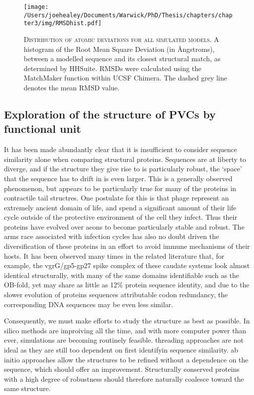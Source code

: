 \begin{figure}[h]
\texttt{[image: /Users/joehealey/Documents/Warwick/PhD/Thesis/chapters/chapter3/img/RMSDhist.pdf]}
	\captionsetup{singlelinecheck=off, justification=justified, font=footnotesize, aboveskip=10pt}
	\caption[I-Tasser homology model accuracy distribution]{\textsc{\normalsize Distribution of atomic deviations for all simulated models.}\vspace{0.1cm} \newline A histogram of the Root Mean Square Deviation (in \AA{}ngstroms), between a modelled sequence and its closest structural match, as determined by HHSuite. RMSDs were calculated using the MatchMaker function within UCSF Chimera. The dashed grey line denotes the mean RMSD value.}
	\label{rmsdhist}
\end{figure}


\subsection{Exploration of the structure of PVCs by functional unit}
It has been made abundantly clear that it is insufficient to consider sequence similarity alone when comparing structural proteins. Sequences are at liberty to diverge, and if the structure they give rise to is particularly robust, the `space' that the sequence has to drift in is even larger. This is a generally observed phenomenon, but appears to be particularly true for many of the proteins in contractile tail structres. One postulate for this is that phage represent an extremely ancient domain of life, and spend a significant amount of their life cycle outside of the protective environment of the cell they infect. Thus their proteins have evolved over aeons to become particularly stable and robust. The arms race associated with infection cycles has also no doubt driven the diversification of these proteins in an effort to avoid immune mechanisms of their hosts. It has been observed many times in the related literature that, for example, the vgrG/gp5-gp27 spike complex of these caudate systems look almost identical structurally, with many of the same domains identifiable such as the OB-fold, yet may share as little as 12\% protein sequence identity, and due to the slower evolution of proteins sequences attributable codon redundancy, the corresponding DNA sequences may be even less similar.

Consequently, we must make efforts to study the structure as best as possible. In silico methods are improiving all the time, and with more computer power than ever, simulations are becoming routinely feasible. threading approaches are not ideal as they are still too dependent on first identifyin sequence similarity. ab initio approaches allow the structures to be refined without a dependence on the sequence, which should offer an improvement. Structurally conserved proteins with a high degree of robustness should therefore naturally coalesce toward the same structure.


